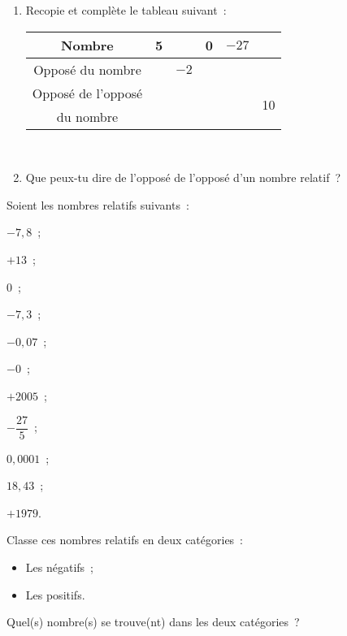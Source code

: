 \begin{exercice}
\begin{enumerate}
 \item Recopie et complète le tableau suivant : \\[0.5em]
{\small
 \begin{tabularx}{\linewidth}{|c|X|c|X|c|c|}
  \hline
 Nombre & 5 & & 0 & $-27$ & \\\hline
 Opposé du nombre & & $-2$ & & & \\\hline
 Opposé de l'opposé & & & & & \multirow{2}{*}{10} \\
du nombre & & & & & \\\hline
  \end{tabularx} \\[0.5em]
  } %
 \item Que peux-tu dire de l'opposé de l'opposé d'un nombre relatif ?
 \end{enumerate}
\end{exercice}


\begin{exercice}[Classement]
Soient les nombres relatifs suivants :
\begin{colitemize}{3}
 \item $-7,8$ ;
 \item $+13$ ;
 \item $0$ ;
 \item $-7,3$ ;
 \item $-0,07$ ;
 \item $-0$ ;
 \item $+2005$ ;
 \item $-\dfrac{27}{5}$ ;
 \item $0,0001$ ;
 \item $18,43$ ;
 \item $+1979$.
 \end{colitemize}
 
Classe ces nombres relatifs en deux catégories :
\begin{itemize}
 \item Les négatifs ;
 \item Les positifs.
 \end{itemize}
Quel(s) nombre(s) se trouve(nt) dans les deux catégories ?
\end{exercice}


